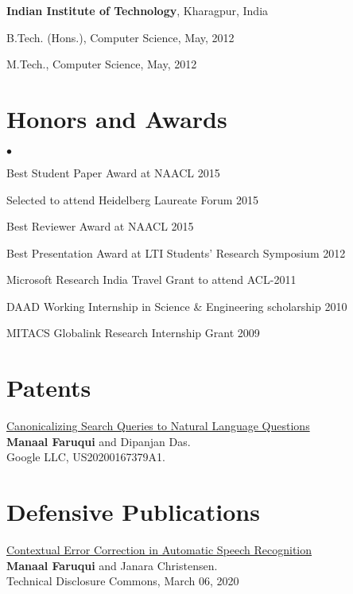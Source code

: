 \documentclass[margin,line]{res}
\newenvironment{list1}{
  \begin{list}{\ding{113}}{%
      \setlength{\itemsep}{0in}
      \setlength{\parsep}{0in} \setlength{\parskip}{0in}
      \setlength{\topsep}{0in} \setlength{\partopsep}{0in}
      \setlength{\leftmargin}{0.17in}}}{\end{list}}
\newenvironment{list2}{
  \begin{list}{$\bullet$}{%
      \setlength{\itemsep}{0in}
      \setlength{\parsep}{0in} \setlength{\parskip}{0in}
      \setlength{\topsep}{0in} \setlength{\partopsep}{0in}
      \setlength{\leftmargin}{0.2in}}}{\end{list}}
\begin{document}
\begin{resume}
{\bf Indian Institute of Technology}, Kharagpur, India\\
\vspace*{-.1in}
\begin{list1}
\item[] B.Tech. (Hons.), Computer Science,  May, 2012
\item[] M.Tech., Computer Science, May, 2012
\end{list1}

\section{\sc Honors and Awards}

\begin{list2}
\item Best Student Paper Award at NAACL 2015
\item Selected to attend Heidelberg Laureate Forum 2015
\item Best Reviewer Award at NAACL 2015
\item Best Presentation Award at LTI Students' Research Symposium 2012
\item Microsoft Research India Travel Grant to attend ACL-2011
\item DAAD Working Internship in Science \& Engineering scholarship 2010
\item MITACS Globalink Research Internship Grant 2009
\end{list2}

\vspace{.2cm}

\section{\sc Patents}
\href{https://patents.google.com/patent/US20200167379A1/en}{Canonicalizing Search Queries to Natural Language Questions}\\
\textbf{Manaal Faruqui} and Dipanjan Das.\\
Google LLC, US20200167379A1.

\section{\sc Defensive Publications}
\href{https://www.tdcommons.org/dpubs_series/2989/}{Contextual Error Correction in Automatic Speech Recognition}\\
\textbf{Manaal Faruqui} and Janara Christensen.\\
Technical Disclosure Commons, March 06, 2020


\end{resume}
\end{document}
